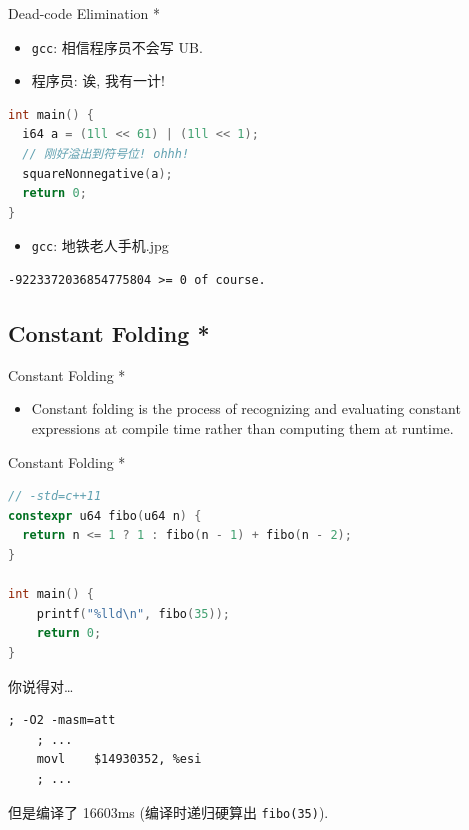 ﻿\documentclass{ctexbeamer}
\begin{document}
\begin{frame}[fragile,shrink=5]{Dead-code Elimination *}
  \begin{itemize}
    \item \texttt{gcc}: 相信程序员不会写 UB.
    \pause
    \item 程序员: 诶, 我有一计!
  \end{itemize}

  \pause
  \begin{lstlisting}[language=C]
int main() {
  i64 a = (1ll << 61) | (1ll << 1);
  // 刚好溢出到符号位! ohhh!
  squareNonnegative(a);
  return 0;
}
  \end{lstlisting}

  \pause
  \begin{itemize}
    \item \texttt{gcc}: 地铁老人手机.jpg
  \end{itemize}

  \pause
  \begin{lstlisting}
-9223372036854775804 >= 0 of course.
  \end{lstlisting}
\end{frame}

\subsection{Constant Folding *}

\begin{frame}{Constant Folding *}
  \begin{itemize}
    \item Constant folding is the process of recognizing and evaluating constant expressions at compile time rather than computing them at runtime.
  \end{itemize}
\end{frame}

\begin{frame}[fragile,shrink=10]{Constant Folding *}
  \begin{lstlisting}[language=C++]
// -std=c++11
constexpr u64 fibo(u64 n) {
  return n <= 1 ? 1 : fibo(n - 1) + fibo(n - 2);
}

int main() {
    printf("%lld\n", fibo(35));
    return 0;
}
  \end{lstlisting}

  \pause
  \qquad 你说得对\dots
  \begin{lstlisting}[language=x86_64]
; -O2 -masm=att
    ; ...
    movl    $14930352, %esi
    ; ...
  \end{lstlisting}

  \pause
  但是编译了 16603ms (编译时递归硬算出 \texttt{fibo(35)}).
\end{frame}
\end{document}
